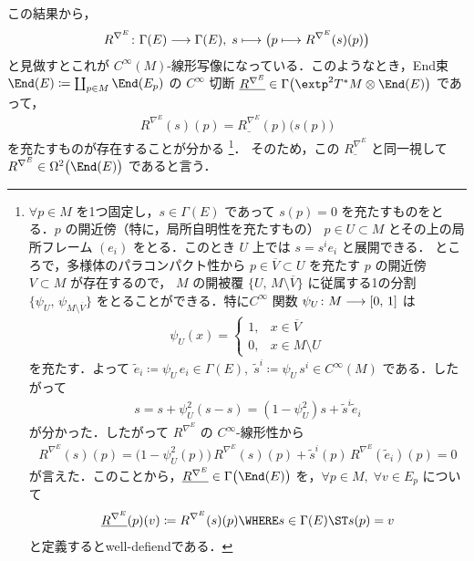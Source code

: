 \documentclass[geometry_main]{subfiles}
\begin{document}
この結果から，
\begin{align}
    R^{\nabla^E} \colon \Gamma(E) \longrightarrow \Gamma(E),\; s \longmapsto \bigl(p \longmapsto R^{\nabla^E}(s)(p)\bigr)
\end{align}
と見做すとこれが $C^\infty(M)$-線形写像になっている．このようなとき，End束 $\End(E) \coloneqq \coprod_{p \in M} \End (E_p)$ の $C^\infty$ 切断
$\underline{R^{\nabla^E}} \in \Gamma \bigl( \extp^2 T^* M \otimes  \End(E) \bigr)$ 
であって，
\begin{align}
    R^{\nabla^E} (s) (p) = \underline{R^{\nabla^E}}(p) \bigl( s(p) \bigr) 
\end{align}
を充たすものが存在することが分かる
\footnote{
    $\forall p \in M$ を1つ固定し，$s \in \Gamma(E)$ であって $s(p) = 0$ を充たすものをとる．$p$ の開近傍（特に，局所自明性を充たすもの） $p \in U \subset M$ とその上の局所フレーム $(e_i)$ をとる．このとき $U$ 上では $s = s^i e_i$ と展開できる．
    ところで，多様体のパラコンパクト性から $p \in \overline{V} \subset U$ を充たす $p$ の開近傍 $V \subset M$ が存在するので，
    $M$ の開被覆 $\{U,\, M \setminus \overline{V}\}$ に従属する1の分割 $\{\psi_U,\, \psi_{M \setminus \overline{V}}\}$ をとることができる．特に$C^\infty$ 関数 $\psi_U \colon M \longrightarrow [0,\, 1]$ は 
    \begin{align}
        \psi_U(x) = 
        \begin{cases}
            1, &x \in \overline{V} \\ 
            0, &x \in M \setminus U
        \end{cases}
    \end{align}
    を充たす．よって $\tilde{e}_i \coloneqq \psi_U\, e_i \in \Gamma(E),\; \tilde{s}^i \coloneqq \psi_U\, s^i \in C^\infty(M)$ である．したがって
    \begin{align}
        s = s + \psi_U^2 (s-s) = (1-\psi_U^2) s + \tilde{s}^i \tilde{e}_i
    \end{align}
    が分かった．したがって $R^{\nabla^E}$ の $C^\infty$-線形性から
    \begin{align}
        R^{\nabla^E} (s)(p) = \bigl(1-\psi_U^2(p)\bigr)\, R^{\nabla^E}(s)(p) + \tilde{s}^i(p)\, R^{\nabla^E}(\tilde{e}_i)(p) = 0
    \end{align}
    が言えた．このことから，$\underline{R^{\nabla^E}} \in \Gamma \bigl( \End (E) \bigr)$ を，$\forall p \in M,\; \forall v \in E_p$ について
    \begin{align}
        \underline{R^{\nabla^E}}(p)(v) \coloneqq R^{\nabla^E} (s)(p) \WHERE s \in \Gamma(E) \ST s(p) = v
    \end{align}
    と定義するとwell-defiendである．
}．
そのため，この $\underline{R^{\nabla^E}}$ と同一視して $R^{\nabla^E} \in \Omega^2 \bigl( \End(E) \bigr)$ であると言う．
\end{document}
